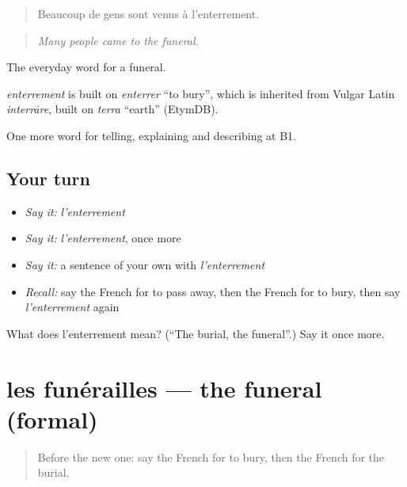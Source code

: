 \begin{quote}
Beaucoup de gens sont venus à l'enterrement.
\end{quote}

\begin{quote}
\emph{Many people came to the funeral.}
\end{quote}

The everyday word for a funeral.

\begin{cousinweb}
\emph{enterrement} is built on \emph{enterrer} \textquotedblleft{}to bury\textquotedblright{}, which is inherited from Vulgar Latin \emph{interrāre}, built on \emph{terra} \textquotedblleft{}earth\textquotedblright{} (EtymDB).
\end{cousinweb}

\begin{grammarlens}[title={What you've built}]
One more word for telling, explaining and describing at B1.
\end{grammarlens}

\subsection*{Your turn}
\begin{itemize}
\raggedright
  \item \emph{Say it:} \emph{l'enterrement}
  \item \emph{Say it:} \emph{l'enterrement}, once more
  \item \emph{Say it:} a sentence of your own with \emph{l'enterrement}
  \item \emph{Recall:} say the French for to pass away, then the French for to bury, then say \emph{l'enterrement} again
\end{itemize}

\begin{tcolorbox}[breakable,colback=teal!4,colframe=teal!35!black,title={Before you move on}]
What does l'enterrement mean? (\textquotedblleft{}The burial, the funeral\textquotedblright{}.) Say it once more.
\end{tcolorbox}
\section[les funérailles]{les funérailles — the funeral (formal)}

\label{lesson:FR-C314-funerailles}



\begin{quote}
Before the new one: say the French for to bury, then the French for the burial.
\end{quote}

